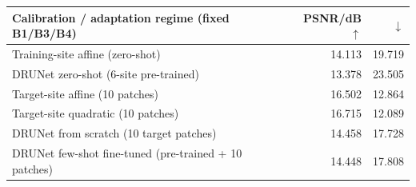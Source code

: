 \begin{tabular}{@{}lrr@{}}
\toprule
Calibration / adaptation regime (fixed B1/B3/B4) & PSNR/dB$\uparrow$ & \dE{}$\downarrow$\\
\midrule
Training-site affine (zero-shot) & 14.113 & 19.719\\
DRUNet zero-shot (6-site pre-trained) & 13.378 & 23.505\\
\midrule
Target-site affine (10 patches) & 16.502 & 12.864\\
Target-site quadratic (10 patches) & 16.715 & 12.089\\
DRUNet from scratch (10 target patches) & 14.458 & 17.728\\
DRUNet few-shot fine-tuned (pre-trained + 10 patches) & 14.448 & 17.808\\
\bottomrule
\end{tabular}
